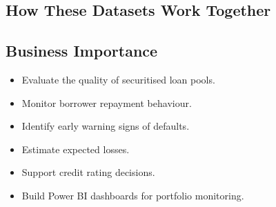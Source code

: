 \subsection*{How These Datasets Work Together}

\begin{center}
	
	
\end{center}

\vspace{0.6cm}

\subsection*{Business Importance}

\begin{itemize}
	
	\item Evaluate the quality of securitised loan pools.
	
	\item Monitor borrower repayment behaviour.
	
	\item Identify early warning signs of defaults.
	
	\item Estimate expected losses.
	
	\item Support credit rating decisions.
	
	\item Build Power BI dashboards for portfolio monitoring.
	
\end{itemize}

